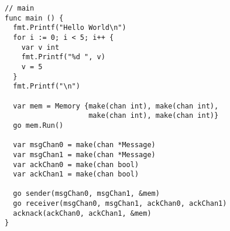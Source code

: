 \begin{lstlisting}[breaklines]
// main
func main () {
  fmt.Printf("Hello World\n")
  for i := 0; i < 5; i++ {
    var v int
    fmt.Printf("%d ", v)
    v = 5
  }
  fmt.Printf("\n")

  var mem = Memory {make(chan int), make(chan int),
                    make(chan int), make(chan int)}
  go mem.Run()

  var msgChan0 = make(chan *Message)
  var msgChan1 = make(chan *Message)
  var ackChan0 = make(chan bool)
  var ackChan1 = make(chan bool)

  go sender(msgChan0, msgChan1, &mem)
  go receiver(msgChan0, msgChan1, ackChan0, ackChan1)
  acknack(ackChan0, ackChan1, &mem)
}
\end{lstlisting}
